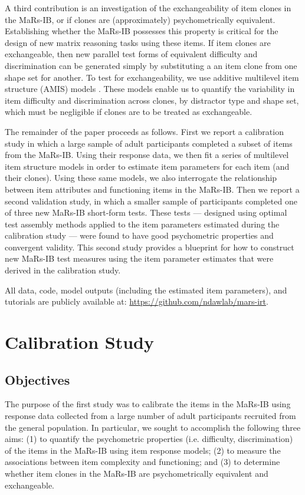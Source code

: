 \documentclass[a4paper,man,natbib]{apa6}
\begin{document}
A third contribution is an investigation of the exchangeability of item clones in the MaRs-IB, or if clones are (approximately) psychometrically equivalent. Establishing whether the MaRs-IB possesses this property is critical for the design of new matrix reasoning tasks using these items. If item clones are exchangeable, then new parallel test forms of equivalent difficulty and discrimination can be generated simply by substituting a an item clone from one shape set for another. To test for exchangeability, we use additive multilevel item structure (AMIS) models \citep{geerlings2011modeling, cho2014additive, lathrop2017item}. These models enable us to quantify the variability in item difficulty and discrimination across clones, by distractor type and shape set, which must be negligible if clones are to be treated as exchangeable. 

The remainder of the paper proceeds as follows. First we report a calibration study in which a large sample of adult participants completed a subset of items from the MaRs-IB. Using their response data, we then fit a series of multilevel item structure models in order to estimate item parameters for each item (and their clones). Using these same models, we also interrogate the relationship between item attributes and functioning items in the MaRs-IB. Then we report a second validation study, in which a smaller sample of participants completed one of three new MaRs-IB short-form tests. These tests --- designed using optimal test assembly methods applied to the item parameters estimated during the calibration study --- were found to have good psychometric properties and convergent validity. This second study provides a blueprint for how to construct new MaRs-IB test measures using the item parameter estimates that were derived in the calibration study.

All data, code, model outputs (including the estimated item parameters), and tutorials are publicly available at: \url{https://github.com/ndawlab/mars-irt}.

\section{Calibration Study}

\subsection{Objectives}

The purpose of the first study was to calibrate the items in the MaRs-IB using response data collected from a large number of adult participants recruited from the general population. In particular, we sought to accomplish the following three aims: (1) to quantify the psychometric properties (i.e. difficulty, discrimination) of the items in the MaRs-IB using item response models; (2) to measure the associations between item complexity and functioning; and (3) to determine whether item clones in the MaRs-IB are psychometrically equivalent and exchangeable.
\end{document}
